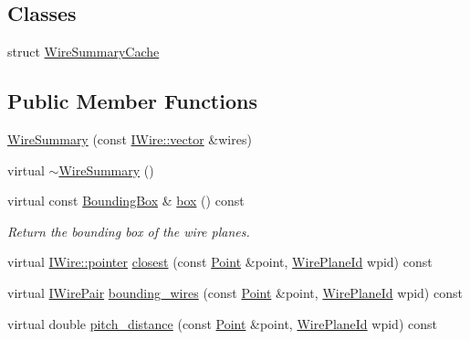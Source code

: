 \subsection*{Classes}
\begin{DoxyCompactItemize}
\item 
struct \hyperlink{struct_wire_summary_1_1_wire_summary_cache}{Wire\+Summary\+Cache}
\end{DoxyCompactItemize}
\subsection*{Public Member Functions}
\begin{DoxyCompactItemize}
\item 
\hyperlink{class_wire_cell_1_1_wire_summary_ab5b972a7d546acd21b85b4e949bd0cec}{Wire\+Summary} (const \hyperlink{class_wire_cell_1_1_i_data_ae1a9f863380499bb43f39fabb6276660}{I\+Wire\+::vector} \&wires)
\item 
virtual \hyperlink{class_wire_cell_1_1_wire_summary_aa01b2eff501094581e90221bea06e3c5}{$\sim$\+Wire\+Summary} ()
\item 
virtual const \hyperlink{class_wire_cell_1_1_bounding_box}{Bounding\+Box} \& \hyperlink{class_wire_cell_1_1_wire_summary_aeb12de01cfc6a14c8745100e5bef3e3d}{box} () const
\begin{DoxyCompactList}\small\item\em Return the bounding box of the wire planes. \end{DoxyCompactList}\item 
virtual \hyperlink{class_wire_cell_1_1_i_data_aff870b3ae8333cf9265941eef62498bc}{I\+Wire\+::pointer} \hyperlink{class_wire_cell_1_1_wire_summary_ad5b6996523e8d8a98fd0caec607fd9ad}{closest} (const \hyperlink{namespace_wire_cell_ab2b2565fa6432efbb4513c14c988cda9}{Point} \&point, \hyperlink{class_wire_cell_1_1_wire_plane_id}{Wire\+Plane\+Id} wpid) const
\item 
virtual \hyperlink{namespace_wire_cell_ad5f0e75d8f0e885d9ae4e9154e812d76}{I\+Wire\+Pair} \hyperlink{class_wire_cell_1_1_wire_summary_a0dd41ce408d6cf49e923a1bd0a893038}{bounding\+\_\+wires} (const \hyperlink{namespace_wire_cell_ab2b2565fa6432efbb4513c14c988cda9}{Point} \&point, \hyperlink{class_wire_cell_1_1_wire_plane_id}{Wire\+Plane\+Id} wpid) const
\item 
virtual double \hyperlink{class_wire_cell_1_1_wire_summary_a61c1c383ee6b110a37609a3d892b01d2}{pitch\+\_\+distance} (const \hyperlink{namespace_wire_cell_ab2b2565fa6432efbb4513c14c988cda9}{Point} \&point, \hyperlink{class_wire_cell_1_1_wire_plane_id}{Wire\+Plane\+Id} wpid) const

\end{DoxyCompactItemize}
